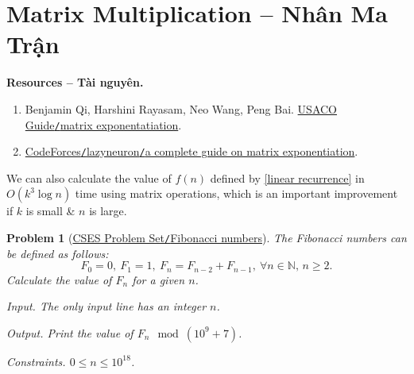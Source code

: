 \documentclass{article}
\newtheorem{problem}{Problem}
\begin{document}
\section{Matrix Multiplication -- Nhân Ma Trận}
\textbf{\textsf{Resources -- Tài nguyên.}}
\begin{enumerate}
    \item {\sc Benjamin Qi, Harshini Rayasam, Neo Wang, Peng Bai}. \href{https://usaco.guide/plat/matrix-expo?lang=cpp}{USACO Guide{\tt/}matrix exponentatiation}.

    \item \href{https://codeforces.com/blog/entry/67776}{CodeForces{\tt/}lazyneuron{\tt/}a complete guide on matrix exponentiation}.
\end{enumerate}
We can also calculate the value of $f(n)$ defined by \eqref{linear recurrence} in $O(k^3\log n)$ time using matrix operations, which is an important improvement if $k$ is small \& $n$ is large.

\begin{problem}[\href{https://cses.fi/problemset/task/1722}{CSES Problem Set{\tt/}Fibonacci numbers}]
    The Fibonacci numbers can be defined as follows:
    \begin{equation}
        \label{Fibonacci}
        F_0 = 0,\ F_1 = 1,\ F_n = F_{n - 2} + F_{n - 1},\ \forall n\in\mathbb{N},\,n\ge2.
    \end{equation}
    Calculate the value of $F_n$ for a given $n$.
    \item {\sf Input.} The only input line has an integer $n$.
    \item {\sf Output.} Print the value of $F_n\mod(10^9 + 7)$.
    \item {\sf Constraints.} $0\le n\le10^{18}$.
\end{problem}
\end{document}
